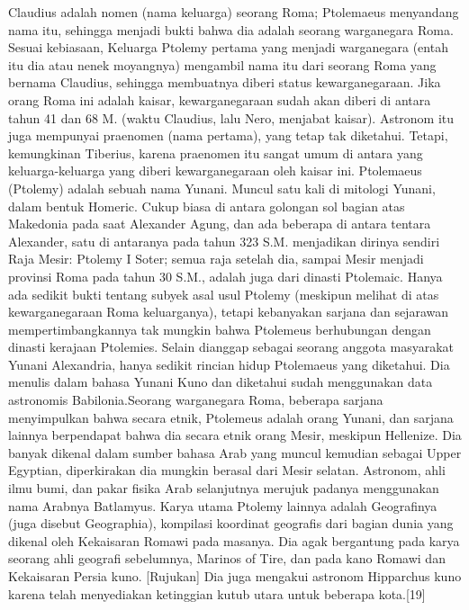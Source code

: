     Claudius adalah nomen (nama keluarga) seorang Roma; Ptolemaeus menyandang nama itu, sehingga menjadi bukti bahwa dia adalah seorang warganegara Roma. Sesuai kebiasaan, Keluarga Ptolemy pertama yang menjadi warganegara (entah itu dia atau nenek moyangnya) mengambil nama itu dari seorang Roma yang bernama Claudius, sehingga membuatnya diberi status kewarganegaraan. Jika orang Roma ini adalah kaisar, kewarganegaraan sudah akan diberi di antara tahun 41 dan 68 M. (waktu Claudius, lalu Nero, menjabat kaisar). Astronom itu juga mempunyai praenomen (nama pertama), yang tetap tak diketahui. Tetapi, kemungkinan Tiberius, karena praenomen itu sangat umum di antara yang keluarga-keluarga yang diberi kewarganegaraan oleh kaisar ini.
    Ptolemaeus (Ptolemy) adalah sebuah nama Yunani. Muncul satu kali di mitologi Yunani, dalam bentuk Homeric. Cukup biasa di antara golongan sol bagian atas Makedonia pada saat Alexander Agung, dan ada beberapa di antara tentara Alexander, satu di antaranya pada tahun 323 S.M. menjadikan dirinya sendiri Raja Mesir: Ptolemy I Soter; semua raja setelah dia, sampai Mesir menjadi provinsi Roma pada tahun 30 S.M., adalah juga dari dinasti Ptolemaic. Hanya ada sedikit bukti tentang subyek asal usul Ptolemy (meskipun melihat di atas kewarganegaraan Roma keluarganya), tetapi kebanyakan sarjana dan sejarawan mempertimbangkannya tak mungkin bahwa Ptolemeus berhubungan dengan dinasti kerajaan Ptolemies.
    Selain dianggap sebagai seorang anggota masyarakat Yunani Alexandria, hanya sedikit rincian hidup Ptolemaeus yang diketahui. Dia menulis dalam bahasa Yunani Kuno dan diketahui sudah menggunakan data astronomis Babilonia.Seorang warganegara Roma, beberapa sarjana menyimpulkan bahwa secara etnik, Ptolemeus adalah orang Yunani, dan sarjana lainnya berpendapat bahwa dia secara etnik orang Mesir, meskipun Hellenize. Dia banyak dikenal dalam sumber bahasa Arab yang muncul kemudian sebagai Upper Egyptian, diperkirakan dia mungkin berasal dari Mesir selatan. Astronom, ahli ilmu bumi, dan pakar fisika Arab selanjutnya merujuk padanya menggunakan nama Arabnya Batlamyus.
    Karya utama Ptolemy lainnya adalah Geografinya (juga disebut Geographia), kompilasi koordinat geografis dari bagian dunia yang dikenal oleh Kekaisaran Romawi pada masanya. Dia agak bergantung pada karya seorang ahli geografi sebelumnya, Marinos of Tire, dan pada kano Romawi dan Kekaisaran Persia kuno. [Rujukan] Dia juga mengakui astronom Hipparchus kuno karena telah menyediakan ketinggian kutub utara untuk beberapa kota.[19]
  
